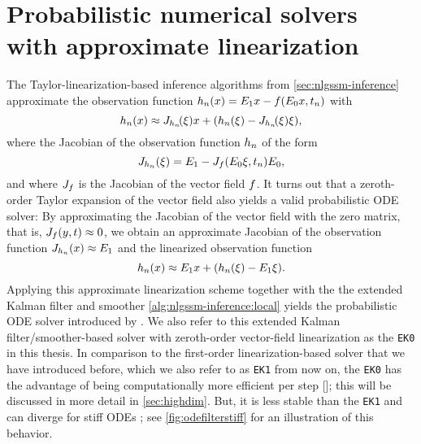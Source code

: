 \documentclass{mimosis}
\begin{document}
\section{Probabilistic numerical solvers with approximate linearization}
\label{sec:org39004dd}
\label{sec:ek0}
\label{remark:ek0}
The Taylor-linearization-based inference algorithms from
\cref{sec:nlgssm-inference}
approximate the observation function
\(\obsh_\idxt(\st) = \proj{1} \st - \vf(\proj{0} \st, t_\idxt)\)
with
\begin{equation}
  \obsh_\idxt(\st) \approx \jac{\obsh_\idxt}\!(\xi) \st + \left( \obsh_\idxt(\xi) - \jac{\obsh_\idxt}\!(\xi) \xi \right),
\end{equation}
where the Jacobian of the observation function \(h_n\) of the form
\begin{equation}
  \jac{\obsh_\idxt}(\xi) = \proj{1} - \jac{\vf}(\proj{0} \xi, t_\idxt) \proj{0},
\end{equation}
and where \(\jac{\vf}\) is the Jacobian of the vector field \(\vf\).
It turns out that a zeroth-order Taylor expansion of the vector field also yields a valid probabilistic ODE solver:
By approximating the Jacobian of the vector field with the zero matrix,
that is, \(\jac{\vf}(\val, t) \approx 0\),
we obtain an approximate Jacobian of the observation function \(J_{h_n}(x) \approx E_{1}\)
and the linearized observation function
\begin{equation}
  \obsh_\idxt(\st) \approx \proj{1} \st + \left( \obsh_\idxt(\xi) - \proj{1} \xi \right).
\end{equation}
Applying this approximate linearization scheme together with the the extended Kalman filter and smoother
\cref{alg:nlgssm-inference:local}
yields the probabilistic ODE solver introduced by
\textcite{schober16_probab_model_numer_solut_initial_value_probl,kersting18_conver_rates_gauss_ode_filter}.
We also refer to this extended Kalman filter/smoother-based solver with zeroth-order vector-field linearization as the \texttt{EK0} in this thesis.
In comparison to the first-order linearization-based solver that we have introduced before, which we also refer to as \texttt{EK1} from now on, the \texttt{EK0} has the advantage of being computationally more efficient per step [\shighdim{}];
this will be discussed in more detail in \cref{sec:highdim}.
But, it is less stable than the \texttt{EK1} and can diverge for stiff ODEs \parencite{tronarp18_probab_solut_to_ordin_differ}; see \cref{fig:odefilterstiff} for an illustration of this behavior.
\end{document}
